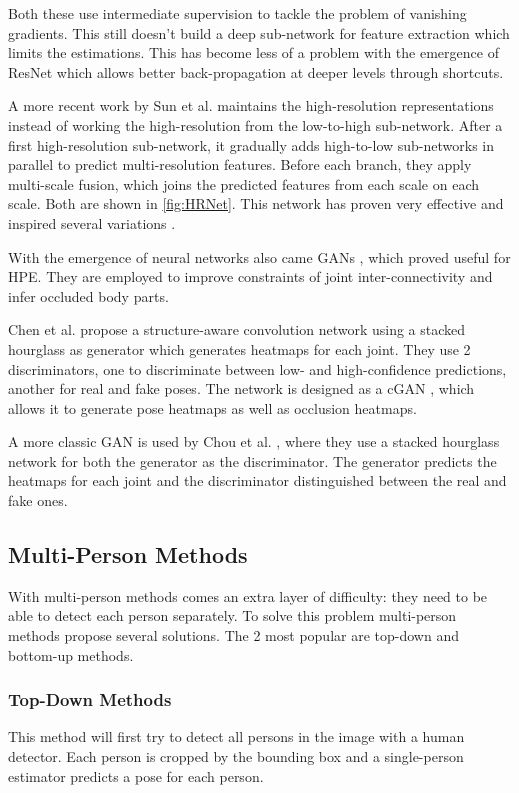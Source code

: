 Both these use intermediate supervision to tackle the problem of vanishing gradients.
This still doesn't build a deep sub-network for feature extraction which limits the estimations.
This has become less of a problem with the emergence of \gls{ResNet}\cite{He2015} which allows better back-propagation at deeper levels through shortcuts.

A more recent work by Sun et al. \cite{Sun2019} maintains the high-resolution representations instead of working the high-resolution from the low-to-high sub-network.
After a first high-resolution sub-network, it gradually adds high-to-low sub-networks in parallel to predict multi-resolution features.
Before each branch, they apply multi-scale fusion, which joins the predicted features from each scale on each scale.
Both are shown in \ref{fig:HRNet}.
This network has proven very effective and inspired several variations \cite{Cheng2019}\cite{Yu2021}\cite{Yuan2021}.

With the emergence of neural networks also came \glspl{GAN} \cite{Goodfellow2014}, which proved useful for \gls{HPE}.
They are employed to improve constraints of joint inter-connectivity and infer occluded body parts.

Chen et al. \cite{Chen2017} propose a structure-aware convolution network using a stacked hourglass as generator which generates heatmaps for each joint.
They use 2 discriminators, one to discriminate between low- and high-confidence predictions, another for real and fake poses.
The network is designed as a \gls{cGAN} \cite{Mirza2014}, which allows it to generate pose heatmaps as well as occlusion heatmaps.

A more classic \gls{GAN} is used by Chou et al. \cite{Chou2017}, where they use a stacked hourglass network for both the generator as the discriminator.
The generator predicts the heatmaps for each joint and the discriminator distinguished between the real and fake ones.

\subsection{Multi-Person Methods}
With multi-person methods comes an extra layer of difficulty: they need to be able to detect each person separately.
To solve this problem multi-person methods propose several solutions. 
The 2 most popular are top-down and bottom-up methods.

\subsubsection{Top-Down Methods}
This method will first try to detect all persons in the image with a human detector.
Each person is cropped by the bounding box and a single-person estimator predicts a pose for each person.

